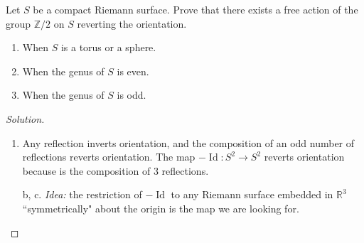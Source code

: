 \documentclass{article}
\newcommand{\R}{\mathbb{R}}
\newcommand{\Z}{\mathbb{Z}}
\DeclareMathOperator{\Id}{Id}
\begin{document}
\begin{exercise}
	Let $S$ be a compact Riemann surface. Prove that there exists a free action of the group $\Z/2$ on $S$ reverting the orientation.
	\begin{enumerate}[label=\alph*.]
		\item When $S$ is a torus or a sphere. 
		\item When the genus of $S$ is even.
		\item When the genus of $S$ is odd.
	\end{enumerate}
\end{exercise}
\begin{proof}[Solution]\leavevmode
		\begin{enumerate}[label=\alph*.]
		\item Any reflection inverts orientation, and the composition of an odd number of reflections reverts orientation. The map $-\Id:S^2\to S^2$ reverts orientation because is the composition of 3 reflections.
		
		\item[b, c.] \textit{Idea:} the restriction of $-\Id$ to any Riemann surface embedded in $\R^3$ ``symmetrically" about the origin is the map we are looking for.
		
	\end{enumerate}
\end{proof}
\end{document}
